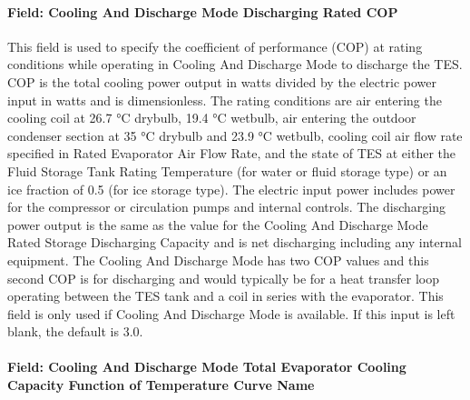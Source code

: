 \paragraph{Field: Cooling And Discharge Mode Discharging Rated COP}\label{field-cooling-and-discharge-mode-discharging-rated-cop}

This field is used to specify the coefficient of performance (COP) at rating conditions while operating in Cooling And Discharge Mode to discharge the TES. COP is the total cooling power output in watts divided by the electric power input in watts and is dimensionless. The rating conditions are air entering the cooling coil at 26.7 °C drybulb, 19.4 °C wetbulb, air entering the outdoor condenser section at 35 °C drybulb and 23.9 °C wetbulb, cooling coil air flow rate specified in Rated Evaporator Air Flow Rate, and the state of TES at either the Fluid Storage Tank Rating Temperature (for water or fluid storage type) or an ice fraction of 0.5 (for ice storage type). The electric input power includes power for the compressor or circulation pumps and internal controls. The discharging power output is the same as the value for the Cooling And Discharge Mode Rated Storage Discharging Capacity and is net discharging including any internal equipment. The Cooling And Discharge Mode has two COP values and this second COP is for discharging and would typically be for a heat transfer loop operating between the TES tank and a coil in series with the evaporator. This field is only used if Cooling And Discharge Mode is available. If this input is left blank, the default is 3.0.

\paragraph{Field: Cooling And Discharge Mode Total Evaporator Cooling Capacity Function of Temperature Curve Name}\label{field-cooling-and-discharge-mode-total-evaporator-cooling-capacity-function-of-temperature-curve-name}

